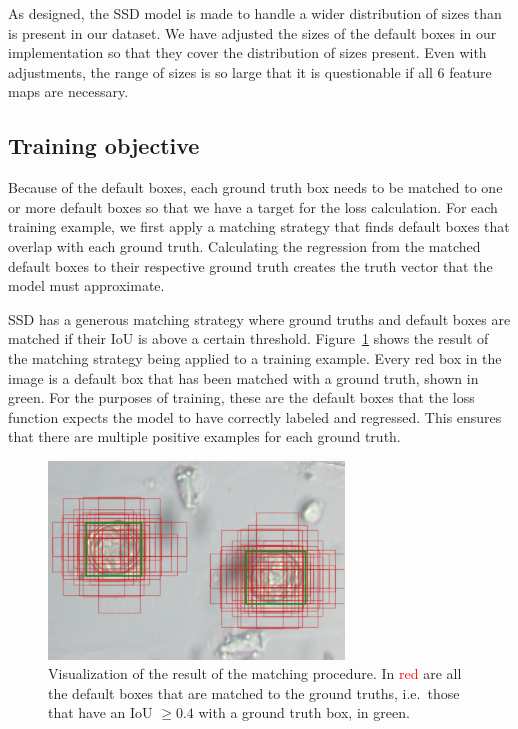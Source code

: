 As designed, the SSD model is made to handle a wider distribution of sizes than is present in our dataset.
We have adjusted the sizes of the default boxes in our implementation so that they cover the distribution of sizes present.
Even with adjustments, the range of sizes is so large that it is questionable if all 6 feature maps are necessary.

\subsection{Training objective}
Because of the default boxes, each ground truth box needs to be matched to one or more default boxes so that we have a target for the loss calculation.
For each training example, we first apply a matching strategy that finds default boxes that overlap with each ground truth.
Calculating the regression from the matched default boxes to their respective ground truth creates the truth vector that the model must approximate.

SSD has a generous matching strategy where ground truths and default boxes are matched if their IoU is above a certain threshold. Figure~\ref{fig:priors} shows the result of the matching strategy being applied to a training example.
Every red box in the image is a default box that has been matched with a ground truth, shown in green. For the purposes of training, these are the default boxes that the loss function expects the model to have correctly labeled and regressed. 
This ensures that there are multiple positive examples for each ground truth.

\begin{figure}[htbp]
  \centering
  \includegraphics[width=0.7\textwidth]{figs/priors_matching}
  \caption[Default box matching]{Visualization of the result of the matching procedure.
In \textcolor{red}{red} are all the default boxes that are matched to the ground truths, i.e.~those that have an IoU \( \geq 0.4 \) with a ground truth box, in \textcolor{nicegreen}{green}.}\label{fig:priors}
\end{figure}


